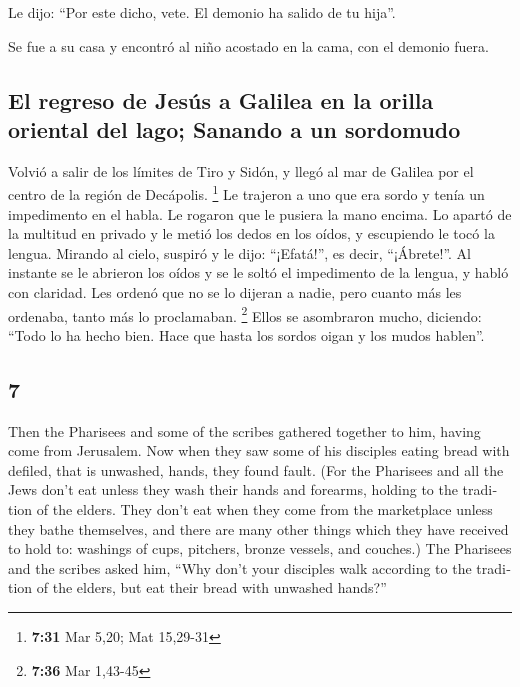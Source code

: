 \begin{paracol}{2}
 Le dijo: ``Por este dicho, vete. El demonio ha salido de
tu hija''.

 Se fue a su casa y encontró al niño acostado en la cama,
con el demonio fuera.

\hypertarget{el-regreso-de-jesuxfas-a-galilea-en-la-orilla-oriental-del-lago-sanando-a-un-sordomudo}{%
\subsection{El regreso de Jesús a Galilea en la orilla oriental del
lago; Sanando a un
sordomudo}\label{el-regreso-de-jesuxfas-a-galilea-en-la-orilla-oriental-del-lago-sanando-a-un-sordomudo}}

 Volvió a salir de los límites de Tiro y Sidón, y llegó
al mar de Galilea por el centro de la región de Decápolis. \footnote{\textbf{7:31}
  Mar 5,20; Mat 15,29-31}  Le trajeron a uno que era
sordo y tenía un impedimento en el habla. Le rogaron que le pusiera la
mano encima.  Lo apartó de la multitud en privado y le
metió los dedos en los oídos, y escupiendo le tocó la lengua.
 Mirando al cielo, suspiró y le dijo: ``¡Efatá!'', es
decir, ``¡Ábrete!''.  Al instante se le abrieron los
oídos y se le soltó el impedimento de la lengua, y habló con claridad.
 Les ordenó que no se lo dijeran a nadie, pero cuanto más
les ordenaba, tanto más lo proclamaban. \footnote{\textbf{7:36} Mar
  1,43-45}  Ellos se asombraron mucho, diciendo: ``Todo
lo ha hecho bien. Hace que hasta los sordos oigan y los mudos hablen''.

\switchcolumn
\begin{otherlanguage}{english}

\hypertarget{section-13}{%
\section{7}\label{section-13}}

 Then the Pharisees and some of the scribes gathered
together to him, having come from Jerusalem.  Now when
they saw some of his disciples eating bread with defiled, that is
unwashed, hands, they found fault.  (For the Pharisees and
all the Jews don't eat unless they wash their hands and forearms,
holding to the tradition of the elders.  They don't eat
when they come from the marketplace unless they bathe themselves, and
there are many other things which they have received to hold to:
washings of cups, pitchers, bronze vessels, and couches.) 
The Pharisees and the scribes asked him, ``Why don't your disciples walk
according to the tradition of the elders, but eat their bread with
unwashed hands?''


\end{otherlanguage}
\end{paracol}
